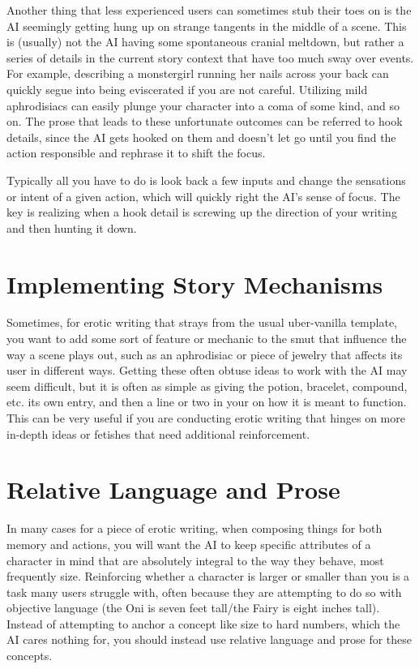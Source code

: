 ﻿\documentclass[Coomer-main.tex]{subfiles}
\begin{document}
Another thing that less experienced users can sometimes stub their toes on is the AI seemingly getting hung up on strange tangents in the middle of a scene.
This is (usually) not the AI having some spontaneous cranial meltdown, but rather a series of details in the current story context that have too much sway over events.
For example, describing a monstergirl running her nails across your back can quickly segue into being eviscerated if you are not careful.
Utilizing mild aphrodisiacs can easily plunge your character into a coma of some kind, and so on.
The prose that leads to these unfortunate outcomes can be referred to hook details, since the AI gets hooked on them and doesn't let go until you find the action responsible and rephrase it to shift the focus.

Typically all you have to do is look back a few inputs and change the sensations or intent of a given action, which will quickly right the AI's sense of focus.
The key is realizing when a hook detail is screwing up the direction of your writing and then hunting it down.

\section{Implementing Story Mechanisms}

Sometimes, for erotic writing that strays from the usual uber-vanilla template, you want to add some sort of feature or mechanic to the smut that influence the way a scene plays out, such as an aphrodisiac or piece of jewelry that affects its user in different ways.
Getting these often obtuse ideas to work with the AI may seem difficult, but it is often as simple as giving the potion, bracelet, compound, etc.
its own \wi entry, and then a line or two in your \rem on how it is meant to function.
This can be very useful if you are conducting erotic writing that hinges on more in-depth ideas or fetishes that need additional reinforcement.

\section{Relative Language and Prose}

In many cases for a piece of erotic writing, when composing things for both memory and actions, you will want the AI to keep specific attributes of a character in mind that are absolutely integral to the way they behave, most frequently size.
Reinforcing whether a character is larger or smaller than you is a task many users struggle with, often because they are attempting to do so with objective language (the Oni is seven feet tall/the Fairy is eight inches tall).
Instead of attempting to anchor a concept like size to hard numbers, which the AI cares nothing for, you should instead use relative language and prose for these concepts.
\end{document}
